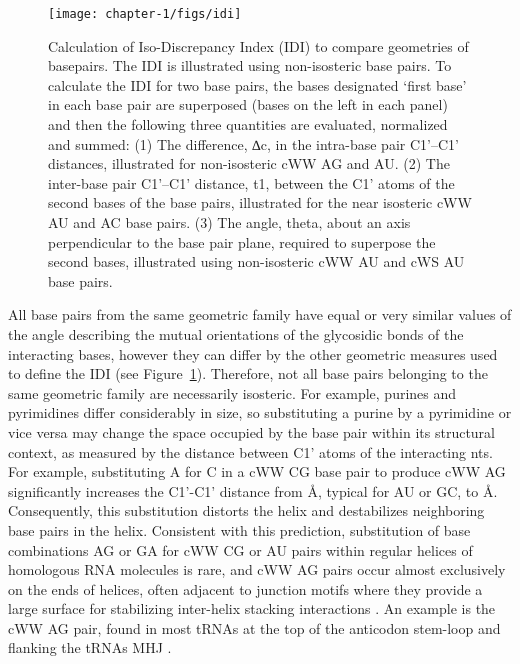 \begin{figure}
  \texttt{[image: chapter-1/figs/idi]}
  \caption{Calculation of Iso-Discrepancy Index (IDI) to compare geometries of
    basepairs. The IDI is illustrated using non-isosteric base pairs. To
    calculate the IDI for two base pairs, the bases designated ‘first base’ in
    each base pair are superposed (bases on the left in each panel) and then the
    following three quantities are evaluated, normalized and summed: (1) The
    difference, ∆c, in the intra-base pair C1’–C1’ distances, illustrated for
    non-isosteric cWW AG and AU. (2) The inter-base pair C1’–C1’ distance, t1,
    between the C1’ atoms of the second bases of the base pairs, illustrated for
    the near isosteric cWW AU and AC base pairs. (3) The angle, theta, about an
    axis perpendicular to the base pair plane, required to superpose the second
  bases, illustrated using non-isosteric cWW AU and cWS AU base pairs.}
  \label{fig:idi}
\end{figure}

All base pairs from the same geometric family have equal or very similar values
of the angle describing the mutual orientations of the glycosidic bonds of the
interacting bases, however they can differ by the other geometric measures used
to define the IDI (see Figure~\ref{fig:idi}). Therefore, not all base pairs belonging to
the same geometric family are necessarily isosteric. For example, purines and
pyrimidines differ considerably in size, so substituting a purine by a
pyrimidine or vice versa may change the space occupied by the base pair within
its structural context, as measured by the distance between C1' atoms of the
interacting nts. For example, substituting A for C in a cWW CG base pair to
produce cWW AG significantly increases the C1'-C1' distance from  \AA,
typical for AU or GC, to  \AA. Consequently, this substitution distorts the
helix and destabilizes neighboring base pairs in the helix. Consistent with this
prediction, substitution of base combinations AG or GA for cWW CG or AU pairs
within regular helices of homologous RNA molecules is rare, and cWW AG pairs
occur almost exclusively on the ends of helices, often adjacent to junction
motifs where they provide a large surface for stabilizing inter-helix stacking
interactions \cite{Sponer2003}. An example is the cWW AG pair, found in most
tRNAs at the top of the anticodon stem-loop and flanking the tRNAs MHJ
\cite{Romby1985}.

